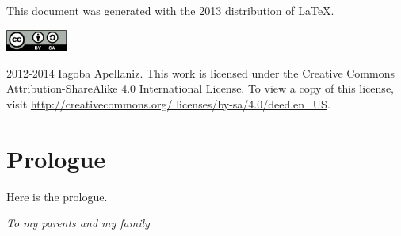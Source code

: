 \documentclass[12pt, letterpaper, twoside]{article}
\begin{document}
\pagestyle{fancy}
\renewcommand{\sectionmark}[1]{\markboth{}{\MakeUppercase{\emph{#1}}}}
\renewcommand{\subsectionmark}[1]{\markboth{\emph{#1}}{}}
\renewcommand{\headrulewidth}{0pt}
\fancyhead{}
\fancyfoot{}





\cleardoublepage

This document was generated with the 2013 distribution of \LaTeX.

\vfill

\includegraphics[height=20pt]{img/0-CreativeCommons-by-sa.png}

2012-2014 Iagoba Apellaniz. This work is licensed under the Creative Commons
Attribution-ShareAlike 4.0 International License. To view a copy of this
license, visit
\href{http://creativecommons.org/licenses/by-sa/4.0/deed.en_US}
{http://creativecommons.org/ licenses/by-sa/4.0/deed.en\_US}.
\clearpage


\section*{Prologue}
\setcounter{page}{1}
\fancyfoot[LE,RO]{\thepage}

Here is the prologue.


\vspace*{100pt}
\tableofcontents


\cleardoublepage
\setcounter{page}{1}
\fancyfoot{}

\cleardoublepage

\vspace*{100pt}
\begin{center}
\emph{To my parents and my family}
\end{center}

\cleardoublepage
\end{document}
